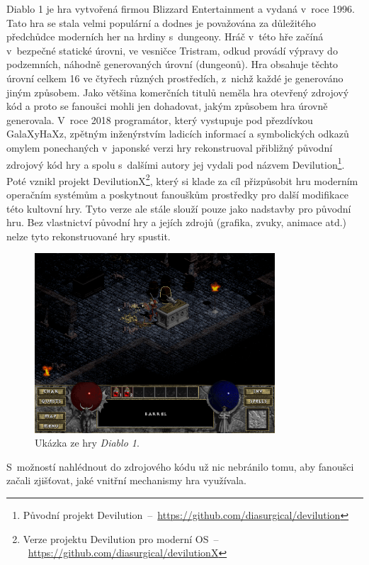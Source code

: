 Diablo 1 je hra vytvořená firmou Blizzard Entertainment a vydaná v~roce 1996.
Tato hra se stala velmi populární a dodnes je považována za důležitého předchůdce moderních her na hrdiny s~dungeony.
Hráč v~této hře začíná v~bezpečné statické úrovni, ve vesničce Tristram, odkud provádí výpravy do podzemních, náhodně generovaných úrovní (dungeonů).
Hra obsahuje těchto úrovní celkem 16 ve čtyřech různých prostředích, z~nichž každé je generováno jiným způsobem.
Jako většina komerčních titulů neměla hra otevřený zdrojový kód a proto se fanoušci mohli jen dohadovat, jakým způsobem hra úrovně generovala.
V~roce 2018 programátor, který vystupuje pod přezdívkou GalaXyHaXz, zpětným inženýrstvím ladicích informací a symbolických odkazů omylem ponechaných v~japonské verzi hry rekonstruoval přibližný původní zdrojový kód hry a spolu s~dalšími autory jej vydali pod názvem Devilution\footnote{Původní projekt Devilution~--~\url{https://github.com/diasurgical/devilution}}.
Poté vznikl projekt DevilutionX\footnote{Verze projektu Devilution pro moderní OS~--~\url{https://github.com/diasurgical/devilutionX}}, který si klade za cíl přizpůsobit hru moderním operačním systémům a poskytnout fanouškům prostředky pro další modifikace této kultovní hry.
Tyto verze ale stále slouží pouze jako nadstavby pro původní hru.
Bez vlastnictví původní hry a jejích zdrojů (grafika, zvuky, animace atd.) nelze tyto rekonstruované hry spustit.
\begin{figure}[t]
    \centering
    \includegraphics[width=0.8\textwidth]{obrazky/diablo_1_gameplay.png}
    \caption{Ukázka ze hry \textit{Diablo 1}.}
    \label{img:diablo_1_gameplay}
\end{figure}
\par
S~možností nahlédnout do zdrojového kódu už nic nebránilo tomu, aby fanoušci začali zjišťovat, jaké vnitřní mechanismy hra využívala.
